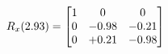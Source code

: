 \documentclass[preview]{standalone}
\begin{document}
\begin{align*}
\special{dvisvgm:raw <g id='unique000'>}R_{x}(2.93) = \begin{bmatrix}1 & 0 & 0 \\0 & -0.98 & -0.21 \\0 & +0.21 & -0.98\end{bmatrix}\special{dvisvgm:raw </g>}
\end{align*}
\end{document}

